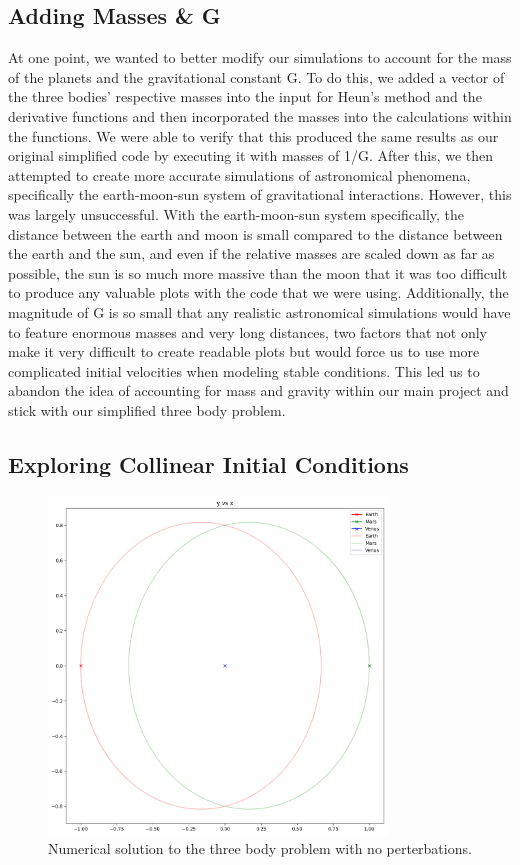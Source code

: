 \documentclass{article}
\begin{document}
\subsection{Adding Masses \& G}
At one point, we wanted to better modify our simulations to account for the mass of the planets and the gravitational constant G. To do this, we added a vector of the three bodies' respective masses into the input for Heun’s method and the derivative functions and then incorporated the masses into the calculations within the functions. We were able to verify that this produced the same results as our original simplified code by executing it with masses of 1/G. After this, we then attempted to create more accurate simulations of astronomical phenomena, specifically the earth-moon-sun system of gravitational interactions. However, this was largely unsuccessful. With the earth-moon-sun system specifically, the distance between the earth and moon is small compared to the distance between the earth and the sun, and even if the relative masses are scaled down as far as possible, the sun is so much more massive than the moon that it was too difficult to produce any valuable plots with the code that we were using. 
	Additionally, the magnitude of G is so small that any realistic astronomical simulations would have to feature enormous masses and very long distances, two factors that not only make it very difficult to create readable plots but would force us to use more complicated initial velocities when modeling stable conditions. This led us to abandon the idea of accounting for mass and gravity within our main project and stick with our simplified three body problem. 

\subsection{Exploring Collinear Initial Conditions}
\begin{figure}[h!]
    \centering
    \includegraphics[width=0.8\textwidth]{Images/noPerterbations.png}
    \caption{Numerical solution to the three body problem with no perterbations.}
    \label{fig:mesh2}
\end{figure}
\end{document}
